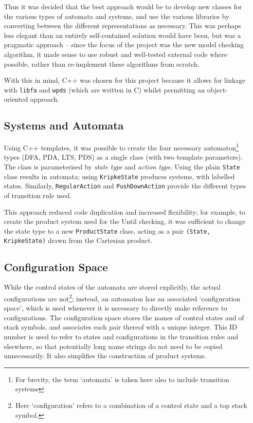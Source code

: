 \documentclass[11pt]{article}
\theoremstyle{definition}
\begin{document}
Thus it was decided that the best approach would be to develop new classes for
the various types of automata and systems, and use the various libraries by
converting between the different representations as necessary.  This was
perhaps less elegant than an entirely self-contained solution would have been,
but was a pragmatic approach -- since the focus of the project was the new
model checking algorithm, it made sense to use robust and well-tested external
code where possible, rather than re-implement these algorithms from scratch.

With this in mind, C++ was chosen for this project because it allows for
linkage with \texttt{libfa} and \texttt{wpds} (which are written in C) whilst
permitting an object-oriented approach.

\subsection{Systems and Automata}

Using C++ templates, it was possible to create the four necessary
automaton\footnote{For brevity, the term `automata' is taken here also to
include transition systems} types (DFA, PDA, LTS, PDS) as a single class (with
two template parameters).  The class is parameterised by \textit{state type}
and \textit{action type}.  Using the plain \texttt{State} class results in
automata; using \texttt{KripkeState} produces systems, with labelled states.
Similarly, \texttt{RegularAction} and \texttt{PushDownAction} provide the
different types of transition rule used.

This approach reduced code duplication and increased flexibility; for example,
to create the product system used for the Until checking, it was sufficient to
change the state type to a new \texttt{ProductState} class, acting as a pair
\texttt{(State, KripkeState)} drawn from the Cartesian product.

\subsection{Configuration Space}


While the control states of the automata are stored explicitly, the actual
configurations are not\footnote{Here `configuration' refers to a combination of
a control state and a top stack symbol.}; instead, an automaton has an
associated `configuration space', which is used whenever it is necessary to
directly make reference to configurations. The configuration space stores the
names of control states and of stack symbols, and associates each pair thereof
with a unique integer. This ID number is used to refer to states and
configurations in the transition rules and elsewhere, so that potentially long
name strings do not need to be copied unnecessarily. It also simplifies the
construction of product systems.
\end{document}
